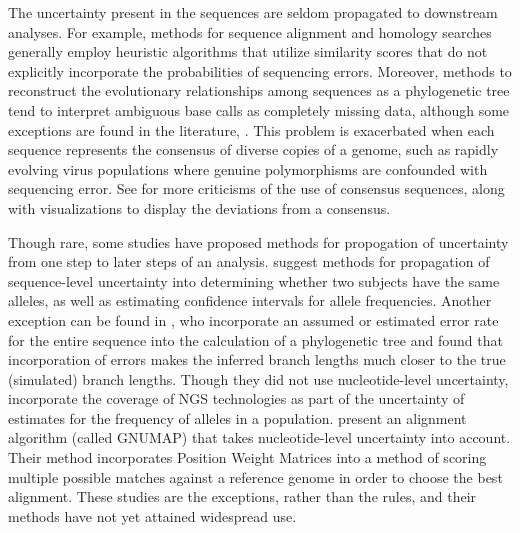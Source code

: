 \documentclass[10pt]{article}
\begin{document}
The uncertainty present in the sequences are seldom propagated to downstream analyses.
For example, methods for sequence alignment and homology searches generally employ heuristic algorithms that utilize similarity scores that do not explicitly incorporate the probabilities of sequencing errors.
Moreover, methods to reconstruct the evolutionary relationships among sequences as a phylogenetic tree tend to interpret ambiguous base calls as completely missing data, although some exceptions are found in the literature, \eg \citet{depristoFrameworkVariationDiscovery2011}.
This problem is exacerbated when each sequence represents the consensus of diverse copies of a genome, such as rapidly evolving virus populations where genuine polymorphisms are confounded with sequencing error. 
See \citet{schneiderConsensusSequenceZen2002} for more criticisms of the use of consensus sequences, along with visualizations \citep[][called \emph{sequence logos}, ]{schneiderSequenceLogosNew1990} to display the deviations from a consensus.

Though rare, some studies have proposed methods for propogation of uncertainty from one step to later steps of an analysis.
\citet{oraweAccountingUncertaintyDNA2015} suggest methods for propagation of sequence-level uncertainty into determining whether two subjects have the same alleles, as well as estimating confidence intervals for allele frequencies. 
Another exception can be found in \citet{kuhnerCorrectingSequencingError2014}, who incorporate an assumed or estimated error rate for the entire sequence into the calculation of a phylogenetic tree and found that incorporation of errors makes the inferred branch lengths much closer to the true (simulated) branch lengths.
Though they did not use nucleotide-level uncertainty, \citet{gompertHierarchicalBayesianModel2011} incorporate the coverage of NGS technologies as part of the uncertainty of estimates for the frequency of alleles in a population.
\citet{clementGNUMAPAlgorithmUnbiased2010} present an alignment algorithm (called GNUMAP) that takes nucleotide-level uncertainty into account. 
Their method incorporates Position Weight Matrices into a method of scoring multiple possible matches against a reference genome in order to choose the best alignment. 
These studies are the exceptions, rather than the rules, and their methods have not yet attained widespread use.
\end{document}
